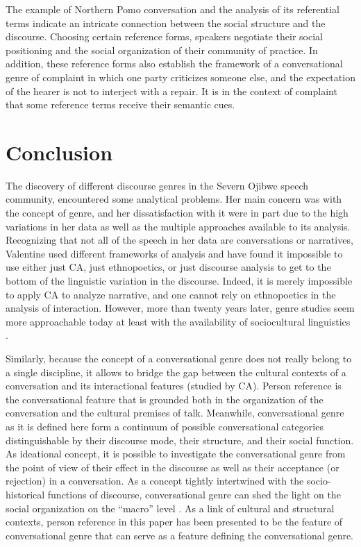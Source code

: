 \documentclass[12pt]{article}
\begin{document}
The example of Northern Pomo conversation and the analysis of its referential terms indicate an intricate connection between the social structure and the discourse. Choosing certain reference forms, speakers negotiate their social positioning and the social organization of their community of practice. In addition, these reference forms also establish the framework of a conversational genre of complaint in which one party criticizes someone else, and the expectation of the hearer is not to interject with a repair. It is in the context of complaint that some reference terms receive their semantic cues. 
\section{Conclusion}
The discovery of different discourse genres in the Severn Ojibwe speech community, \textcite{valentine1995} encountered some analytical problems. Her main concern was with the concept of genre, and her dissatisfaction with it were in part due to the high variations in her data as well as the multiple approaches available to its analysis. Recognizing that not all of the speech in her data are conversations or narratives, Valentine used different frameworks of analysis and have found it impossible to use either just CA, just ethnopoetics, or just discourse analysis to get to the bottom of the linguistic variation in the discourse. Indeed, it is merely impossible to apply CA to analyze narrative, and one cannot rely on ethnopoetics in the analysis of interaction. However, more than twenty years later, genre studies seem more approachable today at least with the availability of sociocultural linguistics \parencite{bucholtz2008}.

Similarly, because the concept of a conversational genre does not really belong to a single discipline, it allows to bridge the gap between the cultural contexts of a conversation and its interactional features (studied by CA). Person reference is the conversational feature that is grounded both in the organization of the conversation and the cultural premises of talk. Meanwhile, conversational genre as it is defined here form a continuum of possible conversational categories distinguishable by their discourse mode, their structure, and their social function. As ideational concept, it is possible to investigate the conversational genre from the point of view of their effect in the discourse as well as their acceptance (or rejection) in a conversation. As a concept tightly intertwined with the socio-historical functions of discourse, conversational genre can shed the light on the social organization on the ``macro'' level \parencite{mayes2005}. As a link of cultural and structural contexts, person reference in this paper has been presented to be the feature of conversational genre that can serve as a feature defining the conversational genre.
\printbibliography
\end{document}
